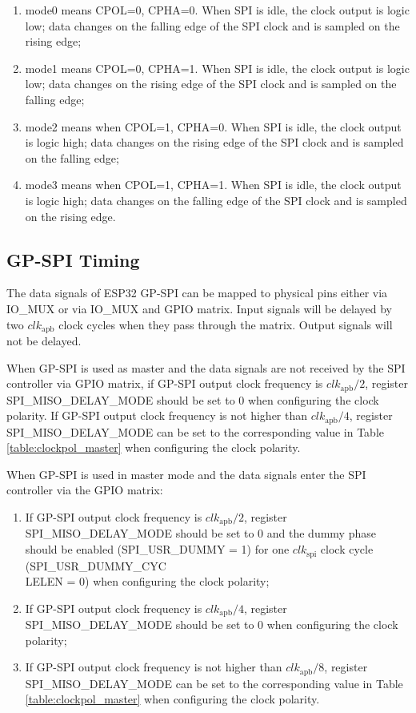 \documentclass[main\_\_EN.tex]{subfiles}
\begin{document}
\begin{enumerate}
    \item mode0 means CPOL=0, CPHA=0. When SPI is idle, the clock output is logic low; data changes on the falling edge of the SPI clock and is sampled on the rising edge;
    \item mode1 means CPOL=0, CPHA=1. When SPI is idle, the clock output is logic low; data changes on the rising edge of the SPI clock and is sampled on the falling edge;
    \newpage
    \item mode2 means when CPOL=1, CPHA=0. When SPI is idle, the clock output is logic high; data changes on the rising edge of the SPI clock and is sampled on the falling edge;
    \item mode3 means when CPOL=1, CPHA=1. When SPI is idle, the clock output is logic high; data changes on the falling edge of the SPI clock and is sampled on the rising edge.
\end{enumerate}

\subsection{GP-SPI Timing}\label{GP-SPI Timing}

The data signals of ESP32 GP-SPI can be mapped to physical pins either via IO\_MUX or via IO\_MUX and GPIO matrix. Input signals will be delayed by two $clk_{\textrm{apb}}$ clock cycles when they pass through the matrix. Output signals will not be delayed.

When GP-SPI is used as master and the data signals are not received by the SPI controller via GPIO matrix, if GP-SPI output clock frequency is $clk_{\textrm{apb}}/2$, register SPI\_MISO\_DELAY\_MODE should be set to 0 when configuring the clock polarity. If GP-SPI output clock frequency is not higher than $clk_{\textrm{apb}}/4$, register SPI\_MISO\_DELAY\_MODE can be set to the corresponding value in Table \ref{table:clockpol_master} when configuring the clock polarity.

When GP-SPI is used in master mode and the data signals enter the SPI controller via the GPIO matrix:

\begin{enumerate}
    \item If GP-SPI output clock frequency is $clk_{\textrm{apb}}/2$, register SPI\_MISO\_DELAY\_MODE should be set to 0 and the dummy phase should be enabled (SPI\_USR\_DUMMY = 1) for one $clk_{\textrm{spi}}$ clock cycle (SPI\_USR\_DUMMY\_CYC\\LELEN = 0) when configuring the clock polarity;
    \item If GP-SPI output clock frequency is $clk_{\textrm{apb}}/4$, register SPI\_MISO\_DELAY\_MODE should be set to 0 when configuring the clock polarity;
    \item If GP-SPI output clock frequency is not higher than $clk_{\textrm{apb}}/8$, register SPI\_MISO\_DELAY\_MODE can be set to the corresponding value in Table \ref{table:clockpol_master} when configuring the clock polarity.
\end{enumerate}
\end{document}
